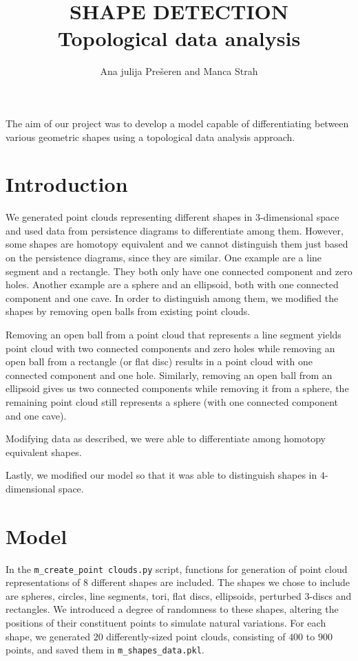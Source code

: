 \documentclass{article}
\title{SHAPE DETECTION \\ Topological data analysis}
\author{Ana julija Prešeren and Manca Strah}
\date{}
\begin{document}
\maketitle


The aim of our project was to develop a model capable of differentiating 
between various geometric shapes using a topological data analysis approach.



\section{Introduction}



We generated point clouds representing different shapes in $3$-dimensional space 
and used data from persistence diagrams to differentiate among them.
However, some shapes are homotopy equivalent and we cannot 
distinguish them just based on the persistence diagrams, since they are similar.
One example are a line segment and a rectangle. They both only have one connected 
component and zero holes. Another example are a sphere and an ellipsoid, both with 
one connected component and one cave.
In order to distinguish among them, we modified the shapes by removing open balls
from existing point clouds. 

Removing an open ball from a point cloud that represents a line segment yields point cloud with two connected components 
and zero holes while removing an open ball from a rectangle (or flat disc) results in a point cloud with one connected component and
one hole.
Similarly, removing an open ball from an ellipsoid gives us two connected components while removing 
it from a sphere, the remaining point cloud still represents a sphere (with one connected component and one cave).

Modifying data as described, we were able to differentiate among homotopy equivalent shapes. 

Lastly, we modified our model so that it was able to distinguish shapes in $4$-dimensional space. 


\section{Model}

In the \verb|m_create_point clouds.py| script,
functions for generation of point cloud representations of 
$8$ different shapes are included. The shapes we chose to 
include are spheres, circles, line segments, tori, flat discs, ellipsoids, 
perturbed 3-discs and rectangles. We introduced a degree of randomness to these shapes, altering the 
positions of their constituent points to simulate natural variations.
For each shape, we generated $20$ differently-sized point clouds, consisting of $400$ to $900$ points, and saved them in 
\verb|m_shapes_data.pkl|.
\end{document}
